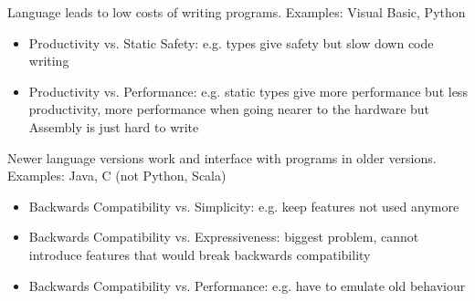 \begin{mytitle}[Productivity] Language leads to low costs of writing programs. Examples: Visual Basic, Python
\begin{itemize}
    \item Productivity vs. Static Safety: e.g. types give safety but slow down code writing
    \item Productivity vs. Performance: e.g. static types give more performance but less productivity, more performance when going nearer to the hardware but Assembly is just hard to write
\end{itemize}
\end{mytitle}
\begin{mytitle} Newer language versions work and interface with programs in older versions. Examples: Java, C (not Python, Scala)
\begin{itemize}
    \item Backwards Compatibility vs. Simplicity: e.g. keep features not used anymore
    \item Backwards Compatibility vs. Expressiveness: biggest problem, cannot introduce features that would break backwards compatibility
    \item Backwards Compatibility vs. Performance: e.g. have to emulate old behaviour
\end{itemize}
\end{mytitle}

